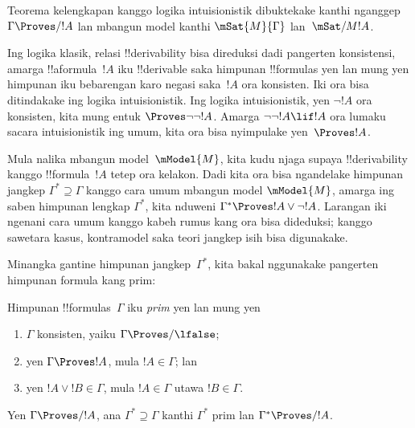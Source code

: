 \documentclass[../../../include/open-logic-section]{subfiles}
\begin{document}


Teorema kelengkapan kanggo logika intuisionistik dibuktekake kanthi
nganggep $\Gamma \Proves/ !A$ lan mbangun model kanthi
$\mSat{M}{\Gamma}$ lan~$\mSat/{M}{!A}$.

Ing logika klasik, relasi !!{derivability} bisa direduksi dadi
pangerten konsistensi, amarga !!a{formula}~$!A$ iku !!{derivable}
saka himpunan !!{formula}s yen lan mung yen himpunan iku bebarengan
karo negasi saka~$!A$ ora konsisten. Iki ora bisa ditindakake ing
logika intuisionistik. Ing logika intuisionistik, yen $\lnot!A$ ora
konsisten, kita mung entuk $\Proves \lnot\lnot !A$. Amarga
$\lnot\lnot!A \lif !A$ ora lumaku sacara intuisionistik ing umum,
kita ora bisa nyimpulake yen~$\Proves !A$.

Mula nalika mbangun model~$\mModel{M}$, kita kudu njaga supaya
!!{derivability} kanggo !!{formula}~$!A$ tetep ora kelakon. Dadi kita
ora bisa ngandelake himpunan jangkep $\Gamma^* \supseteq \Gamma$
kanggo cara umum mbangun model $\mModel{M}$, amarga ing saben himpunan lengkap
$\Gamma^*$, kita nduweni $\Gamma^* \Proves !A \lor \lnot !A$.
Larangan iki ngenani cara umum kanggo kabeh rumus kang ora bisa dideduksi; kanggo sawetara kasus, kontramodel saka teori jangkep isih bisa digunakake.

Minangka gantine himpunan jangkep~$\Gamma^*$, kita bakal nggunakake
pangerten himpunan formula kang prim:

\begin{defn}
  Himpunan !!{formula}s~$\Gamma$ iku \emph{prim} yen lan mung yen
  \begin{enumerate}
  \item{} $\Gamma$ konsisten, yaiku $\Gamma \Proves/ \lfalse$;
  \item{} yen $\Gamma \Proves !A$, mula $!A \in \Gamma$; lan
  \item{} yen $!A \lor !B \in \Gamma$, mula $!A \in
    \Gamma$ utawa $!B \in \Gamma$.
  \end{enumerate}
\end{defn}

\begin{lem}
   Yen $\Gamma \Proves/ !A$, ana
  $\Gamma^* \supseteq \Gamma$ kanthi $\Gamma^*$ prim lan
  $\Gamma^* \Proves/ !A$.
\end{lem}
\end{document}
